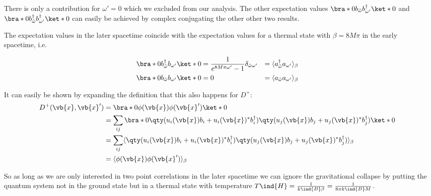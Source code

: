 There is only a contribution for \(\omega' = 0\) which we excluded from our analysis. The other expectation values \(\bra*{0}b_{\tilde{\omega}} b_{\omega'}^\dagger\ket*{0}\) and \(\bra*{0}b_{\tilde{\omega}}^\dagger b_{\omega'}^\dagger\ket*{0}\) can easily be achieved by complex conjugating the other other two results.

The expectation values in the later spacetime coincide with the expectation values for a thermal state with \(\beta = 8 M \pi\) in the early spacetime, i.e.

\begin{align}
\bra*{0}b_{\tilde{\omega}}^\dagger b_{\omega'}\ket*{0} &= \frac{1}{e^{8 M \pi \omega'} - 1} \delta_{\tilde{\omega}\omega'} &= \langle a_{\tilde{\omega}}^\dagger a_{\omega'}\rangle_\beta\\
\bra*{0}b_{\tilde{\omega}} b_{\omega'}\ket*{0} &= 0 &= \langle a_{\tilde{\omega}} a_{\omega'}\rangle_\beta
\end{align}

It can easily be shown by expanding the definition that this also happens for \(D^+\):
\begin{align}
D^+(\vb{x},\vb{x}') &= \bra*{0}\phi(\vb{x})\phi(\vb{x}')\ket*{0}\\
	&= \sum_{ij} \bra*{0}\qty(u_i(\vb{x})b_i + u_i(\vb{x})^*b_i^\dagger)\qty(u_j(\vb{x})b_j + u_j(\vb{x})^*b_j^\dagger)\ket*{0}\\
	&= \sum_{ij} \langle\qty(u_i(\vb{x})b_i + u_i(\vb{x})^*b_i^\dagger)\qty(u_j(\vb{x})b_j + u_j(\vb{x})^*b_j^\dagger)\rangle_\beta\\
	&= \langle\phi(\vb{x})\phi(\vb{x}')\rangle_\beta 
\end{align}

So as long as we are only interested in two point correlations in the later spacetime we can ignore the gravitational collapse  by putting the quantum system not in the ground state but in a thermal state with temperature \(T\ind{H} = \frac{1}{k\ind{B} \beta} = \frac{1}{8\pi k\ind{B} M}\).
